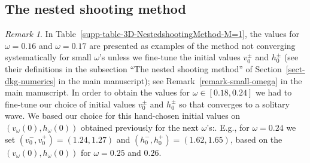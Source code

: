\documentclass[12pt]{extarticle}
\theoremstyle{plain}
\theoremstyle{remark}
\newtheorem*{remark*}{Remark}
\begin{document}
\subsection*{The nested shooting method}
\begin{remark*}
    In Table~\ref{supp-table-3D-NestedshootingMethod-M=1}, the values for $\omega=0.16$ and $\omega=0.17$ are presented as examples of the method not converging systematically for small $\omega$'s unless we fine-tune the initial values $v_0^\pm$ and $h_0^\pm$ (see their definitions in the subsection ``The nested shooting method'' of Section~\ref{sect-dkg-numerics} in the main manuscript); see Remark~\ref{remark-small-omega} in the main manuscript.
    In order to obtain the values for $\omega\in [0.18, 0.24]$ we had to fine-tune our choice of initial values $v_0^\pm$ and $h_0^\pm$ so that converges to a solitary wave. We based our choice for this hand-chosen initial values on $(v_\omega(0), h_\omega(0))$ obtained previously for the next $\omega$'s:. E.g., for $\omega=0.24$ we set $(v_0^-, v_0^+) = (1.24, 1.27)$ and $(h_0^-, h_0^+) = (1.62, 1.65)$, based on the $(v_\omega(0), h_\omega(0))$ for $\omega=0.25$ and $0.26$.
\end{remark*}
\end{document}
